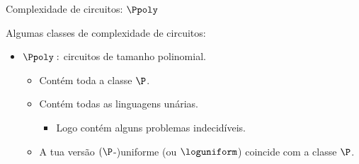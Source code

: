 \documentclass[landscape]{beamer}
\begin{document}
\begin{frame} {Complexidade de circuitos: $\Ppoly$}

Algumas classes de complexidade de circuitos:

\begin{itemize}

	\item $\Ppoly:$ circuitos de tamanho polinomial.
	
	\begin{itemize}
	
		\item Contém toda a classe $\P$.
		
		\item Contém todas as linguagens unárias.
		
		\begin{itemize}
		
			\item Logo contém alguns problemas indecidíveis.
	
		\end{itemize}
		
		\item A tua versão $(\P$-)uniforme (ou $\loguniform$) coincide com a classe $\P$.
	
	\end{itemize}

\end{itemize}

\end{frame}

\end{document}
